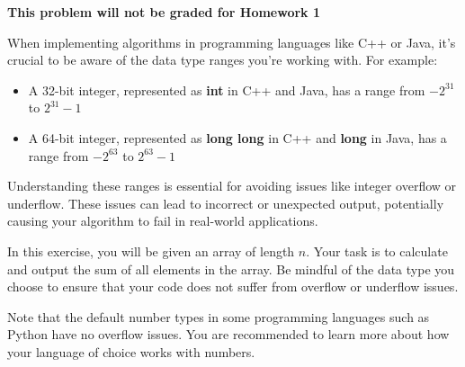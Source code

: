 \textbf{This problem will not be graded for Homework 1} 

When implementing algorithms in programming languages like C++ or Java, it's crucial to be aware of the data type ranges you're working with. For example:

\begin{itemize}
\item A 32-bit integer, represented as \textbf{int} in C++ and Java,  has a range from $-2^{31}$ to $2^{31} - 1$
\item A 64-bit integer, represented as \textbf{long long} in C++ and \textbf{long} in Java, has a range from $-2^{63}$ to $2^{63}-1$
\end{itemize}

Understanding these ranges is essential for avoiding issues like integer overflow or underflow. These issues can lead to incorrect or unexpected output, potentially causing your algorithm to fail in real-world applications.

In this exercise, you will be given an array of length $n$. Your task is to calculate and output the sum of all elements in the array. Be mindful of the data type you choose to ensure that your code does not suffer from overflow or underflow issues.

Note that the default number types in some programming languages such as Python have no overflow issues. You are recommended to learn more about how your language of choice works with numbers.